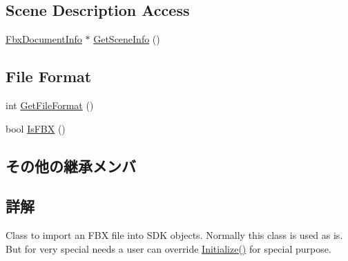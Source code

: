 \subsection*{Scene Description Access}
\begin{DoxyCompactItemize}
\item 
\hyperlink{class_fbx_document_info}{Fbx\+Document\+Info} $\ast$ \hyperlink{class_fbx_importer_addd7b571ebacd64c72057e4c81012a9f}{Get\+Scene\+Info} ()
\end{DoxyCompactItemize}
\subsection*{File Format}
\begin{DoxyCompactItemize}
\item 
int \hyperlink{class_fbx_importer_aeb6c0b442442cf1bf55f3de19983df99}{Get\+File\+Format} ()
\item 
bool \hyperlink{class_fbx_importer_ad6746e77f928bd4dda0b722f557c6ac1}{Is\+F\+BX} ()
\end{DoxyCompactItemize}
\subsection*{その他の継承メンバ}


\subsection{詳解}
Class to import an F\+BX file into S\+DK objects. Normally this class is used as is. But for very special needs a user can override \hyperlink{class_fbx_importer_a70528a9ca1ff737bda9696a2073acd13}{Initialize()} for special purpose.

